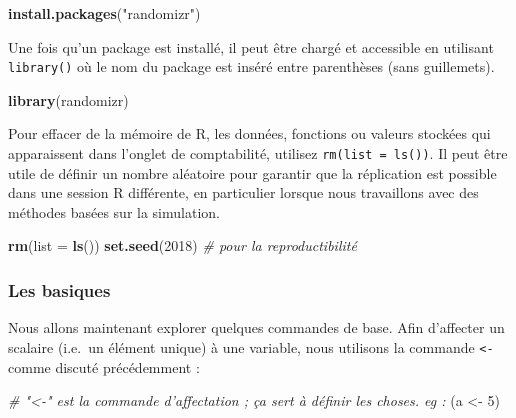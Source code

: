 \documentclass[12pt,]{book}
\newenvironment{Shaded}{\begin{snugshade}}{\end{snugshade}}
\newcommand{\CommentTok}[1]{\textcolor[rgb]{0.56,0.35,0.01}{\textit{#1}}}
\newcommand{\DataTypeTok}[1]{\textcolor[rgb]{0.13,0.29,0.53}{#1}}
\newcommand{\DecValTok}[1]{\textcolor[rgb]{0.00,0.00,0.81}{#1}}
\newcommand{\KeywordTok}[1]{\textcolor[rgb]{0.13,0.29,0.53}{\textbf{#1}}}
\newcommand{\NormalTok}[1]{#1}
\newcommand{\StringTok}[1]{\textcolor[rgb]{0.31,0.60,0.02}{#1}}
\begin{document}
\begin{Shaded}
\begin{Highlighting}[]
\KeywordTok{install.packages}\NormalTok{(}\StringTok{"randomizr"}\NormalTok{)  }
\end{Highlighting}
\end{Shaded}

Une fois qu'un package est installé, il peut être chargé et accessible en utilisant \texttt{library()} où le nom du package est inséré entre parenthèses (sans guillemets).

\begin{Shaded}
\begin{Highlighting}[]
\KeywordTok{library}\NormalTok{(randomizr)}
\end{Highlighting}
\end{Shaded}

Pour effacer de la mémoire de R, les données, fonctions ou valeurs stockées qui apparaissent dans l'onglet de comptabilité, utilisez \texttt{rm(list\ =\ ls())}. Il peut être utile de définir un nombre aléatoire pour garantir que la réplication est possible dans une session R différente, en particulier lorsque nous travaillons avec des méthodes basées sur la simulation.

\begin{Shaded}
\begin{Highlighting}[]
\KeywordTok{rm}\NormalTok{(}\DataTypeTok{list =} \KeywordTok{ls}\NormalTok{())                                   }
\KeywordTok{set.seed}\NormalTok{(}\DecValTok{2018}\NormalTok{)  }\CommentTok{# pour la reproductibilité}
\end{Highlighting}
\end{Shaded}

\hypertarget{les-basiques}{%
\subsubsection{Les basiques}\label{les-basiques}}

Nous allons maintenant explorer quelques commandes de base. Afin d'affecter un scalaire (i.e.~un élément unique) à une variable, nous utilisons la commande \texttt{\textless{}-} comme discuté précédemment :

\begin{Shaded}
\begin{Highlighting}[]
\CommentTok{# "<-"  est la commande d'affectation ; ça sert à définir les choses. eg :}
\NormalTok{(a <-}\StringTok{ }\DecValTok{5}\NormalTok{)     }
\end{Highlighting}
\end{Shaded}
\end{document}
